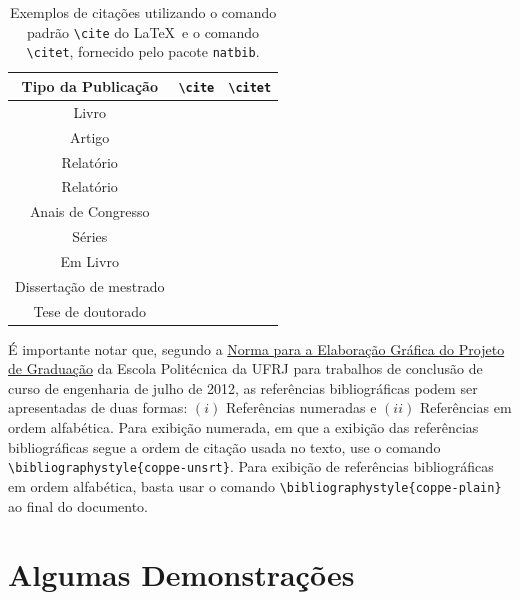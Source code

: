 \documentclass[grad,numbers]{coppe}
\begin{document}
  \begin{table}[h]
  \caption{Exemplos de citações utilizando o comando padrão
    \texttt{\textbackslash cite} do \LaTeX\ e
    o comando \texttt{\textbackslash citet},
    fornecido pelo pacote \texttt{natbib}.}
  \label{tab:citation}
  \centering
  {\footnotesize
  \begin{tabular}{|c|c|c|}
    \hline
    Tipo da Publicação & \verb|\cite| & \verb|\citet|\\
    \hline
    Livro & \cite{book-example} & \citet{book-example}\\
    Artigo & \cite{article-example} & \citet{article-example}\\
    Relatório & \cite{techreport-example} & \citet{techreport-example}\\
    Relatório & \cite{techreport-exampleIn} & \citet{techreport-exampleIn}\\
    Anais de Congresso & \cite{inproceedings-example} &
      \citet{inproceedings-example}\\
    Séries & \cite{incollection-example} & \citet{incollection-example}\\
    Em Livro & \cite{inbook-example} & \citet{inbook-example}\\
    Dissertação de mestrado & \cite{mastersthesis-example} &
      \citet{mastersthesis-example}\\
    Tese de doutorado & \cite{phdthesis-example} & \citet{phdthesis-example}\\
    \hline
  \end{tabular}}
  \end{table}
  
  É importante notar que, segundo a \href{http://www.poli.ufrj.br/graduacao_projeto.php}{Norma para a Elaboração Gráfica do Projeto de Graduação} da Escola Politécnica da UFRJ para trabalhos de conclusão de curso de engenharia de julho de 2012, as referências bibliográficas podem ser apresentadas de duas formas: $(i)$ Referências numeradas e $(ii)$ Referências em ordem alfabética. Para exibição numerada, em que a exibição das referências bibliográficas segue a ordem de citação usada no texto, use o comando \texttt{\textbackslash bibliographystyle\{coppe-unsrt\}}. Para exibição de referências bibliográficas em ordem alfabética, basta usar o comando \texttt{\textbackslash bibliographystyle\{coppe-plain\}} ao final do documento. 

  \backmatter
  
  

  \appendix
  \chapter{Algumas Demonstrações}
\end{document}
